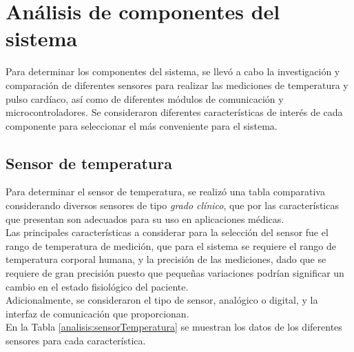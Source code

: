 \newpage
\section{Análisis de componentes del sistema}
Para determinar los componentes del sistema, se llevó a cabo la investigación y comparación de diferentes sensores para realizar las mediciones de temperatura y pulso cardíaco, así como de diferentes módulos de comunicación y microcontroladores. Se consideraron diferentes características de interés de cada componente para seleccionar el más conveniente para el sistema.


\subsection{Sensor de temperatura}
Para determinar el sensor de temperatura, se realizó una tabla comparativa considerando diversos sensores de tipo \textit{grado clínico}, que por las características que presentan son adecuados para su uso en aplicaciones médicas. \\

Las principales características a considerar para la selección del sensor fue el rango de temperatura de medición, que para el sistema se requiere el rango de temperatura corporal humana, y la precisión de las mediciones, dado que se requiere de gran precisión puesto que pequeñas variaciones podrían significar un cambio en el estado fisiológico del paciente.\\

Adicionalmente, se consideraron el tipo de sensor, analógico o digital, y la interfaz de comunicación que proporcionan.\\

En la Tabla \ref{analisis:sensorTemperatura} se muestran los datos de los diferentes sensores para cada característica. \\


